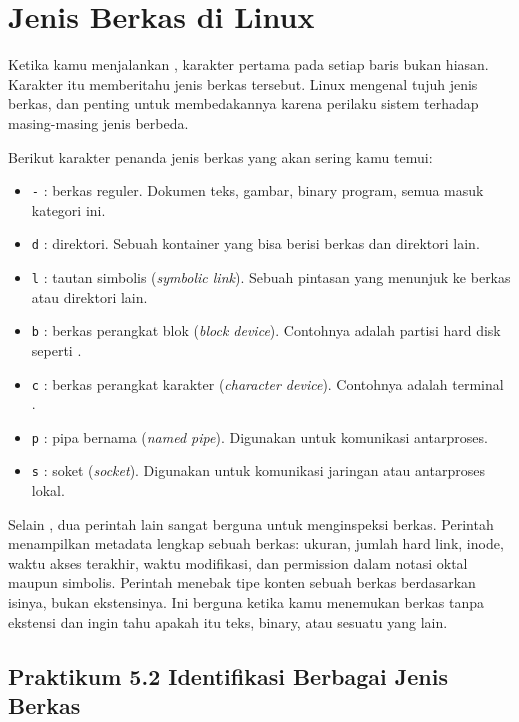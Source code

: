 \section{Jenis Berkas di Linux}
\label{sec:filetypes}

Ketika kamu menjalankan , karakter pertama pada setiap baris bukan hiasan.
Karakter itu memberitahu jenis berkas tersebut. Linux mengenal tujuh jenis berkas, dan
penting untuk membedakannya karena perilaku sistem terhadap masing-masing jenis berbeda.

Berikut karakter penanda jenis berkas yang akan sering kamu temui:

\begin{itemize}
    \item \texttt{-} : berkas reguler. Dokumen teks, gambar, binary program, semua masuk kategori ini.
    \item \texttt{d} : direktori. Sebuah kontainer yang bisa berisi berkas dan direktori lain.
    \item \texttt{l} : tautan simbolis (\textit{symbolic link}). Sebuah pintasan yang menunjuk ke berkas atau direktori lain.
    \item \texttt{b} : berkas perangkat blok (\textit{block device}). Contohnya adalah partisi hard disk seperti .
    \item \texttt{c} : berkas perangkat karakter (\textit{character device}). Contohnya adalah terminal .
    \item \texttt{p} : pipa bernama (\textit{named pipe}). Digunakan untuk komunikasi antarproses.
    \item \texttt{s} : soket (\textit{socket}). Digunakan untuk komunikasi jaringan atau antarproses lokal.
\end{itemize}

Selain , dua perintah lain sangat berguna untuk menginspeksi berkas. Perintah
 menampilkan metadata lengkap sebuah berkas: ukuran, jumlah hard link, inode,
waktu akses terakhir, waktu modifikasi, dan permission dalam notasi oktal maupun simbolis.
Perintah  menebak tipe konten sebuah berkas berdasarkan isinya, bukan ekstensinya.
Ini berguna ketika kamu menemukan berkas tanpa ekstensi dan ingin tahu apakah itu teks,
binary, atau sesuatu yang lain.

\subsection*{Praktikum 5.2 Identifikasi Berbagai Jenis Berkas}


